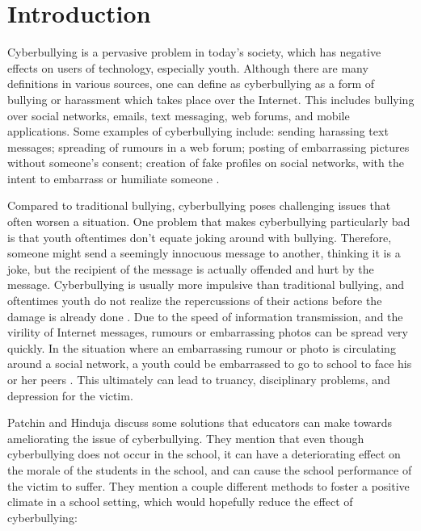 \section{Introduction}
    Cyberbullying is a pervasive problem in today's society, which has negative effects on users of technology, especially youth. Although there are many definitions in various sources, one can define as cyberbullying as a form of bullying or harassment which takes place over the Internet. This includes bullying over social networks, emails, text messaging, web forums, and mobile applications. Some examples of cyberbullying include: sending harassing text messages; spreading of rumours in a web forum; posting of embarrassing pictures without someone's consent; creation of fake profiles on social networks, with the intent to embarrass or humiliate someone \cite{what_is_cyberbullying}. 
    
    	Compared to traditional bullying, cyberbullying poses challenging issues that often worsen a situation.  One problem that makes cyberbullying particularly bad is that youth oftentimes don't equate joking around with bullying. Therefore, someone might send a seemingly innocuous message to another, thinking it is a joke, but the recipient of the message is actually offended and hurt by the message.  Cyberbullying is usually more impulsive than traditional bullying, and oftentimes youth do not realize the repercussions of their actions before the damage is already done \cite{what_is_cyberbullying}. Due to the speed of information transmission, and the virility of Internet messages, rumours or embarrassing photos can be spread very quickly. In the situation where an embarrassing rumour or photo is circulating around a social network, a youth could be embarrassed to go to school to face his or her peers \cite{cyber_vs_traditional}. This ultimately can lead to truancy, disciplinary problems, and depression for the victim.
    	
    	Patchin and Hinduja \cite{patchin2012} discuss some solutions that educators can make towards ameliorating the issue of cyberbullying. They mention that even though cyberbullying does not occur in the school, it can have a deteriorating effect on the morale of the students in the school, and can cause the school performance of the victim to suffer. They mention a couple different methods to foster a positive climate in a school setting, which would hopefully reduce the effect of cyberbullying:

